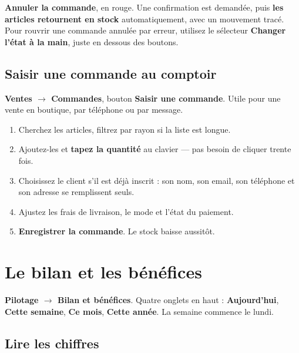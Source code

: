 \documentclass[11pt,a4paper]{article}
\newcommand{\bouton}[1]{\textbf{\textcolor{sig}{#1}}}
\newcommand{\menu}[1]{\textsf{\textbf{#1}}}
\begin{document}
\bouton{Annuler la commande}, en rouge. Une confirmation est demandée, puis
\textbf{les articles retournent en stock} automatiquement, avec un mouvement
tracé. Pour rouvrir une commande annulée par erreur, utilisez le sélecteur
\menu{Changer l'état à la main}, juste en dessous des boutons.

\subsection{Saisir une commande au comptoir}

\menu{Ventes $\rightarrow$ Commandes}, bouton \bouton{Saisir une commande}.
Utile pour une vente en boutique, par téléphone ou par message.

\begin{enumerate}
  \item Cherchez les articles, filtrez par rayon si la liste est longue.
  \item Ajoutez-les et \textbf{tapez la quantité} au clavier — pas besoin de cliquer trente fois.
  \item Choisissez le client s'il est déjà inscrit : son nom, son email, son téléphone et son adresse se remplissent seuls.
  \item Ajustez les frais de livraison, le mode et l'état du paiement.
  \item \bouton{Enregistrer la commande}. Le stock baisse aussitôt.
\end{enumerate}

\section{Le bilan et les bénéfices}

\menu{Pilotage $\rightarrow$ Bilan et bénéfices}. Quatre onglets en haut :
\bouton{Aujourd'hui}, \bouton{Cette semaine}, \bouton{Ce mois},
\bouton{Cette année}. La semaine commence le lundi.

\subsection{Lire les chiffres}
\end{document}
